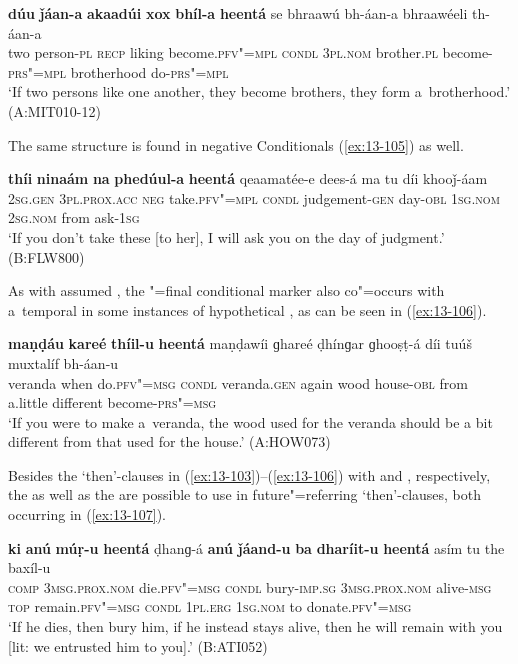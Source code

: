 \ex
\label{ex:13-104}
\gll \textbf{dúu} \textbf{ǰáan-a} \textbf{akaadúi} \textbf{xox} \textbf{bhíl-a} \textbf{heentá} se bhraawú bh-áan-a bhraawéeli th-áan-a\\
two person-\textsc{pl} \textsc{recp} liking become.\textsc{pfv"=mpl} \textsc{condl} \textsc{3pl.nom} brother.\textsc{pl} become-\textsc{prs"=mpl} brotherhood do-\textsc{prs"=mpl} \\
\glt `If two persons like one another, they become brothers, they form a~brotherhood.' (A:MIT010-12) 
\z

The same structure is found in negative Conditionals (\ref{ex:13-105}) as well.

\begin{exe}
\ex
\label{ex:13-105}
\gll \textbf{thíi} \textbf{ninaám} \textbf{na} \textbf{phedúul-a} \textbf{heentá}  qeaamatée-e dees-á ma tu díi khooǰ-áam \\
\textsc{2sg.gen} \textsc{3pl.prox.acc} \textsc{neg} take.\textsc{pfv"=mpl} \textsc{condl} judgement-\textsc{gen} day-\textsc{obl} \textsc{1sg.nom} \textsc{2sg.nom} from ask-\textsc{1sg}  \\
\glt `If you don't take these [to her], I will ask you on the day of judgment.' (B:FLW800) 
\end{exe}

As with assumed , the "=final conditional marker also co"=occurs with a~temporal  in some instances of hypothetical , as can be seen in (\ref{ex:13-106}). 

\ea
\label{ex:13-106}
\gll \textbf{maṇḍáu} \textbf{kareé} \textbf{thíil-u} \textbf{heentá} maṇḍawíi ɡhareé ḍhínɡar ɡhooṣṭ-á díi tuúš muxtalíf bh-áan-u  \\
veranda when do.\textsc{pfv"=msg} \textsc{condl} veranda.\textsc{gen} again wood house-\textsc{obl} from a.little different become-\textsc{prs"=msg} \\
\glt `If you were to make a~veranda, the wood used for the veranda should be a bit different from that used for the house.' (A:HOW073) 
\z

Besides the `then'-clauses in (\ref{ex:13-103})--(\ref{ex:13-106}) with  and , respectively, the  as well as the  are possible to use in future"=referring `then'-clauses, both occurring in (\ref{ex:13-107}).

\ea
\label{ex:13-107}
\gll \textbf{ki} \textbf{anú} \textbf{múṛ-u} \textbf{heentá} ḍhanɡ-á  \textbf{anú} \textbf{ǰáand-u} \textbf{ba} \textbf{dharíit-u} \textbf{heentá} asím tu the baxíl-u\\
\textsc{comp} \textsc{3msg.prox.nom} die.\textsc{pfv"=msg} \textsc{condl} bury-\textsc{imp.sg}  \textsc{3msg.prox.nom} alive-\textsc{msg} \textsc{top} remain.\textsc{pfv"=msg} \textsc{condl}  \textsc{1pl.erg} \textsc{1sg.nom} to donate.\textsc{pfv"=msg}\\
\glt `If he dies, then bury him, if he instead stays alive, then he will remain with you [lit: we entrusted him to you].' (B:ATI052) 
\z

